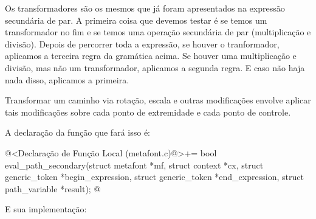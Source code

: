 {Os transformadores são os mesmos que já foram apresentados na
expressão secundária de par. A primeira coisa que devemos testar é se
temos um transformador no fim e se temos uma operação secundária de
par (multiplicação e divisão). Depois de percorrer toda a expressão,
se houver o tranformador, aplicamos a terceira regra da gramática
acima. Se houver uma multiplicação e divisão, mas não um
transformador, aplicamos a segunda regra. E caso não haja nada disso,
aplicamos a primeira.

Transformar um caminho via rotação, escala e outras modificações
envolve aplicar tais modificações sobre cada ponto de extremidade e
cada ponto de controle.

A declaração da função que fará isso é:

\iniciocodigo
@<Declaração de Função Local (metafont.c)@>+=
bool eval_path_secondary(struct metafont *mf, struct context *cx,
                        struct generic_token *begin_expression,
                        struct generic_token *end_expression,
                        struct path_variable *result);
@
\fimcodigo

E sua implementação:

}
